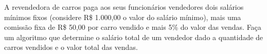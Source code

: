 
\question[10]

A revendedora de carros paga aos seus funcionários vendedores dois salários mínimos fixos (considere R\$ 1.000,00 o valor do salário mínimo), mais uma comissão fixa de R\$ 50,00 por carro vendido e mais 5\% do valor das vendas. Faça um algoritmo que determine o salário total de um vendedor dado a quantidade de carros vendidos e o valor total das vendas.

